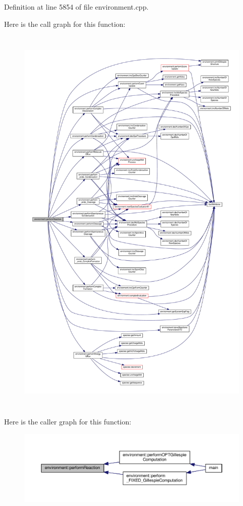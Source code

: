 Definition at line 5854 of file environment.\-cpp.



Here is the call graph for this function\-:\nopagebreak
\begin{figure}[H]
\begin{center}
\leavevmode
\includegraphics[height=550pt]{a00011_a1db4e67ba458a54f4fab3e10a203765c_cgraph}
\end{center}
\end{figure}




Here is the caller graph for this function\-:\nopagebreak
\begin{figure}[H]
\begin{center}
\leavevmode
\includegraphics[width=350pt]{a00011_a1db4e67ba458a54f4fab3e10a203765c_icgraph}
\end{center}
\end{figure}


